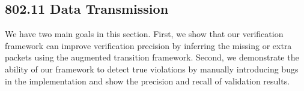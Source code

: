 \subsection{802.11 Data Transmission}
\label{subsec:tx}

We have two main goals in this section.  First, we show that our
verification framework can improve verification precision by inferring
the missing or extra packets using the augmented transition
framework.
Second, we demonstrate the ability of our framework to detect true violations by
manually introducing bugs in the \ns{} implementation and show the precision and
recall of validation results.

